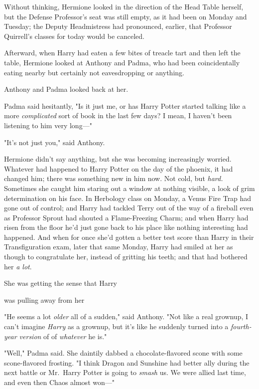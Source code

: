 Without thinking, Hermione looked in the direction of the Head Table herself,
but the Defense Professor's seat was still empty, as it had been on Monday and
Tuesday; the Deputy Headmistress had pronounced, earlier, that Professor
Quirrell's classes for today would be canceled.

Afterward, when Harry had eaten a few bites of treacle tart and then left the
table, Hermione looked at Anthony and Padma, who had been coincidentally eating
nearby but certainly not eavesdropping or anything.

Anthony and Padma looked back at her.

Padma said hesitantly, "Is it just me, or has Harry Potter started talking like
a more \emph{complicated} sort of book in the last few days? I mean, I haven't
been listening to him very long\mbox{---}"

"It's not just you," said Anthony.

Hermione didn't say anything, but she was becoming increasingly worried.
Whatever had happened to Harry Potter on the day of the phoenix, it had changed
him; there was something new in him now. Not cold, but \emph{hard.} Sometimes
she caught him staring out a window at nothing visible, a look of grim
determination on his face. In Herbology class on Monday, a Venus Fire Trap had
gone out of control; and Harry had tackled Terry out of the way of a fireball
even as Professor Sprout had shouted a Flame-Freezing Charm; and when Harry had
risen from the floor he'd just gone back to his place like nothing interesting
had happened. And when for once she'd gotten a better test score than Harry in
their Transfiguration exam, later that same Monday, Harry had smiled at her as
though to congratulate her, instead of gritting his teeth; and{\el} that had
bothered her \emph{a lot}.

She was getting the sense that Harry{\el}

{\el} was pulling away from her{\el}

"He seems a lot \emph{older} all of a sudden," said Anthony. "Not like a real
grownup, I can't imagine \emph{Harry} as a grownup, but it's like he suddenly
turned into a \emph{fourth-year version} of{\el} of \emph{whatever} he is."

"Well," Padma said. She daintily dabbed a chocolate-flavored scone with some
scone-flavored frosting. "I think Dragon and Sunshine had better ally during
the next battle or Mr.~Harry Potter is going to \emph{smash} us. We were allied
last time, and even then Chaos almost won\mbox{---}"

